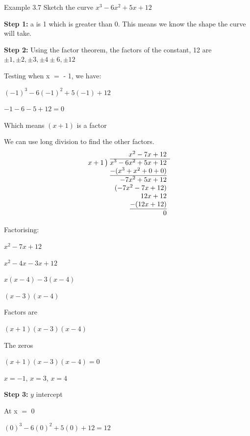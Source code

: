 \begin{example}{Example 3.7}
Sketch the curve $x^3 - 6x^2 + 5x + 12$

\solution
\textbf{Step 1:} a is 1 which is greater than 0. This means we know the shape the curve
will take.

\textbf{Step 2:} Using the factor theorem, the factors of the constant, 12 are
$\pm 1, \pm 2, \pm 3, \pm 4 \pm 6, \pm 12$

Testing when x $=$ - 1, we have:

$(-1)^3 - 6(-1)^2 + 5(-1) + 12$

$-1 - 6 - 5 + 12 = 0$

Which means $(x + 1)$ is a factor

We can use long division to find the other factors.
\[
\begin{array}{r@{\;}r}
 & x^2 - 7x + 12 \\ \cline{2-2}
x + 1\,\big) & x^3 - 6x^2 + 5x + 12 \\
 & \underline{-(x^3 + x^2 + 0 + 0)} \\
 & -7x^2 + 5x + 12 \\
 & (-7x^2 - 7x + 12) \\
 & 12x + 12 \\
 & \underline{-(12x + 12)} \\
 & 0
\end{array}
\]

Factorising:

$x^2 - 7x + 12$

$x^2 - 4x - 3x + 12$

$x(x - 4) - 3(x - 4)$

$(x - 3)(x - 4)$

Factors are

$(x + 1)(x - 3)(x - 4)$

The zeros

$(x + 1)(x - 3)(x - 4) = 0$

$x = -1$, $x = 3$, $x = 4$

\textbf{Step 3:} $y$ intercept

At x $=$ 0

$(0)^3 - 6(0)^2 + 5(0) + 12 = 12$


\end{example}

